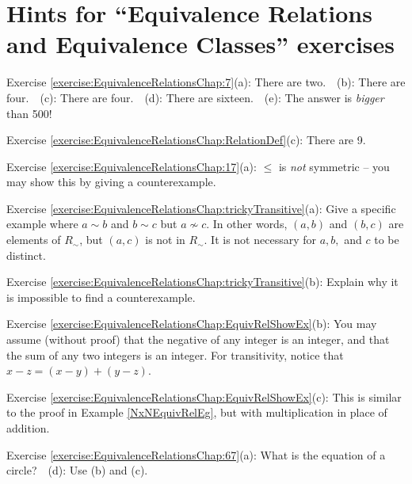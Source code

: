 \section{Hints for ``Equivalence Relations and Equivalence Classes'' exercises}\label{secEqRelChapHints} 

\noindent Exercise \ref{exercise:EquivalenceRelationsChap:7}(a): There are two.~~(b): There are four.~~(c): There are four.~~(d): There are sixteen.~~(e): The answer is \emph{bigger} than 500!

\noindent Exercise \ref{exercise:EquivalenceRelationsChap:RelationDef}(c): There are 9.

\noindent Exercise \ref{exercise:EquivalenceRelationsChap:17}(a): $\leq$ is \emph{not} symmetric -- you may show this by giving a counterexample.

\noindent Exercise \ref{exercise:EquivalenceRelationsChap:trickyTransitive}(a): Give a specific example where $a \sim b$ and $b \sim c$ but $a \not\sim c$.  In other words, $(a,b)$ and $(b,c)$ are elements of $R_{\sim}$, but $(a,c)$ is not in  $R_{\sim}$. It is not necessary for $a,b,$ and $c$ to be distinct.

\noindent Exercise \ref{exercise:EquivalenceRelationsChap:trickyTransitive}(b): Explain why it is impossible to find a counterexample.

\noindent Exercise \ref{exercise:EquivalenceRelationsChap:EquivRelShowEx}(b): You may assume (without proof) that the negative of any integer is an integer, and that the sum of any two integers is an integer. For transitivity, notice that $x - z = (x - y) + (y - z)$.

\noindent Exercise \ref{exercise:EquivalenceRelationsChap:EquivRelShowEx}(c): This is similar to the proof in Example \ref{NxNEquivRelEg}, but with multiplication in place of addition.

\noindent Exercise \ref{exercise:EquivalenceRelationsChap:67}(a): What is the equation of a circle?~~(d): Use (b) and (c).

